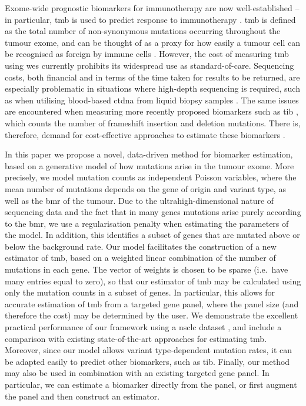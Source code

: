 \documentclass[12pt]{article}
\begin{document}
Exome-wide prognostic biomarkers for immunotherapy are now well-established -- in particular, \gls{tmb} is used to predict response to immunotherapy \citep{zhu_association_2019, cao_high_2019}.  \gls{tmb} is defined as the total number of non-synonymous mutations occurring throughout the tumour exome, and can be thought of as a proxy for how easily a tumour cell can be recognised as foreign by immune cells \citep{chan_development_2019}. However, the cost of measuring \gls{tmb} using \gls{wes} \citep{sboner_real_2011} currently prohibits its widespread use as standard-of-care.  Sequencing costs, both financial and in terms of the time taken for results to be returned, are especially problematic in situations where high-depth sequencing is required, such as when utilising blood-based \gls{ctdna} from liquid biopsy samples \citep{gandara_blood-based_2018}. The same issues are encountered when measuring more recently proposed biomarkers such as \gls{tib} \citep{wu_tumor_2019,turajlic_insertion-and-deletion-derived_2017}, which counts the number of frameshift insertion and deletion mutations. There is, therefore, demand for cost-effective approaches to estimate these biomarkers \citep{fancello_tumor_2019, golkaram_interplay_2020}.

In this paper we propose a novel, data-driven method for biomarker estimation, based on a generative model of how mutations arise in the tumour exome.  More precisely, we model mutation counts as independent Poisson variables, where the mean number of mutations depends on the gene of origin and variant type, as well as the \gls{bmr} of the tumour. Due to the ultrahigh-dimensional nature of sequencing data and the fact that in many genes mutations arise purely according to the \gls{bmr}, we use a regularisation penalty when estimating the parameters of the model. In addition, this identifies a subset of genes that are mutated above or below the background rate. Our model facilitates the construction of a new estimator of \gls{tmb}, based on a weighted linear combination of the number of mutations in each gene. The vector of weights is chosen to be sparse (i.e.~have many entries equal to zero), so that our estimator of \gls{tmb} may be calculated using only the mutation counts in a subset of genes. In particular, this allows for accurate estimation of \gls{tmb} from a targeted gene panel, where the panel size (and therefore the cost) may be determined by the user.  We demonstrate the excellent practical performance of our framework using a \gls{nsclc} dataset \citep{chalmers_analysis_2017}, and include a comparison with existing state-of-the-art approaches for estimating \gls{tmb}.  Moreover, since our model allows variant type-dependent mutation rates, it can be adapted easily to predict other biomarkers, such as \gls{tib}. Finally, our method may also be used in combination with an existing targeted gene panel. In particular, we can estimate a biomarker directly from the panel, or first augment the panel and then construct an estimator.  
\end{document}
